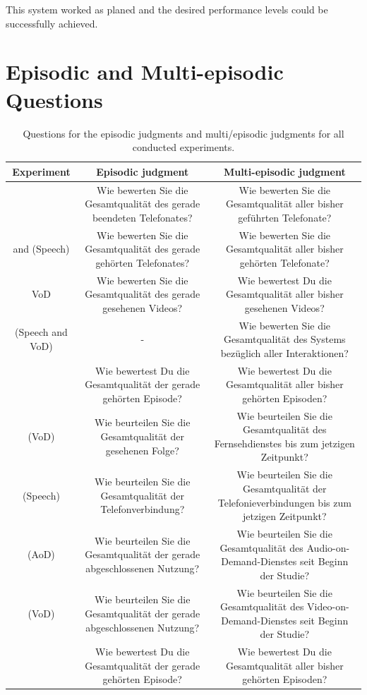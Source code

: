 This system worked as planed and the desired performance levels could be successfully achieved.

\chapter{Episodic and Multi-episodic Questions }\label{appendix:questions}
\begin{table}[h]
 \small
 \centering
 \caption{Questions for the episodic judgments and multi\-/episodic judgments for all conducted experiments.}
 \label{tab:appendix:questions}
 \begin{tabulary}{\textwidth}{C|C|C}
   Experiment & Episodic judgment & Multi-episodic judgment\\
   \midrule
     	& Wie bewerten Sie die Gesamtqualität des gerade beendeten Telefonates? & Wie bewerten Sie die Gesamtqualität aller bisher geführten Telefonate? \\
   \hline
   \EIIa{}	 and \EIIb{} (Speech) & Wie bewerten Sie die Gesamtqualität des gerade gehörten Telefonates? & Wie bewerten Sie die Gesamtqualität aller bisher gehörten Telefonate? \\
   \hline
   \EIIb{} \ac{VoD} & Wie bewerten Sie die Gesamtqualität des gerade gesehenen Videos? & Wie bewertest Du die Gesamtqualität aller bisher gesehenen Videos? \\
   \hline 
   \EIIb{} (Speech and \ac{VoD}) & - & Wie bewerten Sie die Gesamtqualität des Systems bezüglich aller Interaktionen? \\
   \hline
    & Wie bewertest Du die Gesamtqualität der gerade gehörten Episode? & Wie bewertest Du die Gesamtqualität aller bisher gehörten Episoden? \\
   \hline
    (\ac{VoD}) & Wie beurteilen Sie die Gesamtqualität der gesehenen Folge? & Wie beurteilen Sie die Gesamtqualität des Fernsehdienstes bis zum jetzigen Zeitpunkt? \\
   \hline
    (Speech) & Wie beurteilen Sie die Gesamtqualität der Telefonverbindung? & Wie beurteilen Sie die Gesamtqualität der Telefonieverbindungen bis zum jetzigen Zeitpunkt?\\
   \hline
    (\ac{AoD}) & Wie beurteilen Sie die Gesamtqualität der gerade abgeschlossenen Nutzung? & Wie beurteilen Sie die Gesamtqualität des Audio-on-Demand-Dienstes seit Beginn der Studie? \\
   \hline
    (\ac{VoD}) & Wie beurteilen Sie die Gesamtqualität der gerade abgeschlossenen Nutzung? & Wie beurteilen Sie die Gesamtqualität des Video-on-Demand-Dienstes seit Beginn der Studie? \\
   \hline
    & Wie bewertest Du die Gesamtqualität der gerade gehörten Episode? & Wie bewertest Du die Gesamtqualität aller bisher gehörten Episoden? \\
   \end{tabulary}
\end{table}

